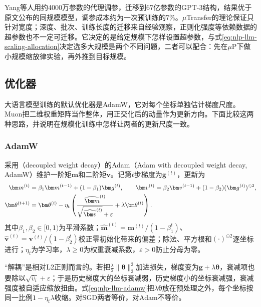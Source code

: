Yang等人用约4000万参数的代理调参，迁移到67亿参数的GPT-3结构，结果优于原文公布的同规模模型，调参成本约为一次预训练的7\%。$\mu$Transfer的理论保证只针对宽度；深度、批次、训练长度的迁移来自经验观察，正则化强度等依赖数据的超参数也不一定可迁移。它决定的是给定规模下怎样设置超参数，与式\eqref{eq:nlp-llm-scaling-allocation}决定选多大规模是两个不同问题，二者可以配合：先在$\mu$P下做小规模缩放律实验，再外推到目标规模。

\subsection{优化器}
\label{sec:nlp-llm-optimizer}

大语言模型训练的默认优化器是AdamW，它对每个坐标单独估计梯度尺度。Muon把二维权重矩阵当作整体，用正交化后的动量作为更新方向。下面比较这两种思路，并说明在规模化训练中怎样让两者的更新尺度一致。

\subsubsection{AdamW}
\label{sec:nlp-llm-adamw-update}

采用（decoupled weight decay）的Adam（Adam with decoupled weight decay, AdamW）维护一阶矩$\bm m$和二阶矩$\bm v$。记第$t$步梯度为$\bm g^{(t)}$，更新为
\begin{align}
 \bm m^{(t)}&=\beta_1\bm m^{(t-1)}+(1-\beta_1)\bm g^{(t)},\qquad
 \bm v^{(t)}=\beta_2\bm v^{(t-1)}+(1-\beta_2)(\bm g^{(t)})^{\odot2},\notag\\
 \bm\theta^{(t+1)}&=\bm\theta^{(t)}
  -\eta_t\left(\frac{\widehat{\bm m}^{(t)}}{\sqrt{\widehat{\bm v}^{(t)}}+\varepsilon}+\lambda\bm\theta^{(t)}\right).
 \label{eq:nlp-llm-adamw}
\end{align}
其中$\beta_1,\beta_2\in[0,1)$为平滑系数；$\widehat{\bm m}^{(t)}=\bm m^{(t)}/(1-\beta_1^t)$、$\widehat{\bm v}^{(t)}=\bm v^{(t)}/(1-\beta_2^t)$校正零初始化带来的偏差；除法、平方根和$(\cdot)^{\odot2}$逐坐标进行；$\eta_t$为学习率，$\lambda\geq0$为权重衰减系数，$\varepsilon>0$防止分母为零。

“解耦”是相对L2正则而言的。若把$\tfrac\lambda2\lVert\bm\theta\rVert_2^2$加进损失，梯度变为$\bm g+\lambda\bm\theta$，衰减项也要除以$\sqrt{\widehat v_i}+\varepsilon$；于是历史梯度大的坐标衰减弱，历史梯度小的坐标衰减强，衰减强度被自适应缩放扭曲。式\eqref{eq:nlp-llm-adamw}把$\lambda\bm\theta$放在预处理之外，每个坐标按同一比例$1-\eta_t\lambda$收缩。对SGD两者等价，对Adam不等价。

